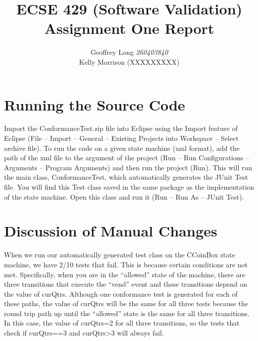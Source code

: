 \documentclass[11pt, a4paper]{article}
\title{ECSE 429 (Software Validation) \\ Assignment One Report}
\author{Geoffrey Long \textit{260403840} \\ Kelly Morrison (XXXXXXXXX)}
\begin{document}
\maketitle






\section{Running the Source Code}
Import the ConformanceTest.zip file into Eclipse using the Import feature of Eclipse (File – Import – General – Existing Projects into Workspace – Select archive file). To run the code on a given state machine (xml format), add the path of the xml file to the argument of the project (Run – Run Configurations – Arguments – Program Arguments) and then run the project (Run). This will run the main class, ConformanceTest, which automatically generates the JUnit Test file. You will find this Test class saved in the same package as the implementation of the state machine. Open this class and run it (Run – Run As – JUnit Test). 

\section{Discussion of Manual Changes}
When we run our automatically generated test class on the CCoinBox state machine, we have 2/10 tests that fail. This is because certain conditions are not met. Specifically, when you are in the “allowed” state of the machine, there are three transitions that execute the “vend” event and these transitions depend on the value of curQtrs. Although one conformance test is generated for each of these paths, the value of curQtrs will be the same for all three tests because the round trip path up until the “allowed” state is the same for all three transitions. In this case, the value of curQtrs=2 for all three transitions, so the tests that check if curQtrs==3 and curQtrs>3 will always fail. 
\end{document}
